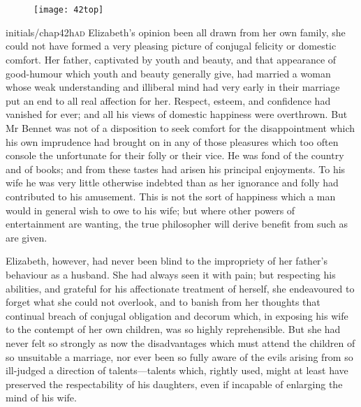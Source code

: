 \chapter[Chapter \thechapter]{}
	
	
\begin{figure}[t!]
\centering
\texttt{[image: 42top]}
\end{figure}


\lettrine[lines=6,image=true]{initials/chap42h}{ad}  Elizabeth's opinion been all drawn from her own family, she could not have formed a very pleasing picture of conjugal felicity or domestic comfort. Her father, captivated by youth and beauty, and that appearance of good-humour which youth and beauty generally give, had married a woman whose weak understanding and illiberal mind had very early in their marriage put an end to all real affection for her. Respect, esteem, and confidence had vanished for ever; and all his views of domestic happiness were overthrown. But Mr Bennet was not of a disposition to seek comfort for the disappointment which his own imprudence had brought on in any of those pleasures which too often console the unfortunate for their folly or their vice. He was fond of the country and of books; and from these tastes had arisen his principal enjoyments. To his wife he was very little otherwise indebted than as her ignorance and folly had contributed to his amusement. This is not the sort of happiness which a man would in general wish to owe to his wife; but where other powers of entertainment are wanting, the true philosopher will derive benefit from such as are given.

Elizabeth, however, had never been blind to the impropriety of her father's behaviour as a husband. She had always seen it with pain; but respecting his abilities, and grateful for his affectionate treatment of herself, she endeavoured to forget what she could not overlook, and to banish from her thoughts that continual breach of conjugal obligation and decorum which, in exposing his wife to the contempt of her own children, was so highly reprehensible. But she had never felt so strongly as now the disadvantages which must attend the children of so unsuitable a marriage, nor ever been so fully aware of the evils arising from so ill-judged a direction of talents—talents which, rightly used, might at least have preserved the respectability of his daughters, even if incapable of enlarging the mind of his wife.

